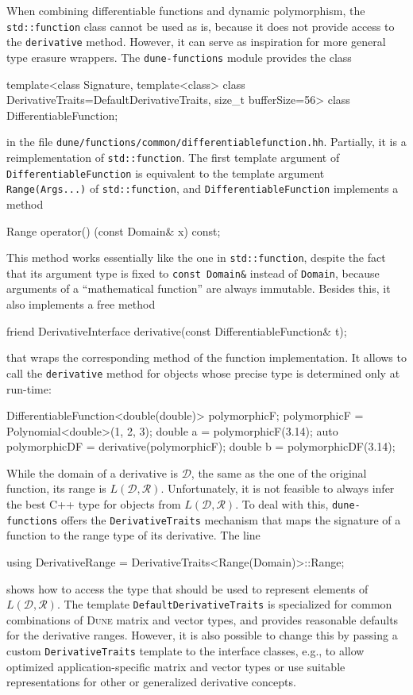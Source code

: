 \documentclass[11pt,
                 numbers=noenddot,
                 headings=normal,
                 DIV16, BCOR10mm]{scrartcl}
\newcommand{\cpp}{\lstinline}
\theoremstyle{remark}
\newcommand{\dune}{\textsc{Dune}\xspace}
\newcommand{\dunemodule}[1]{\texttt{#1}}
\newcommand{\file}[1]{\texttt{#1}}
\begin{document}
When combining differentiable functions and dynamic polymorphism, the \cpp{std::function} class cannot be used as is,
because it does not provide access to the \cpp{derivative} method.  However, it can serve as inspiration for more general
type erasure wrappers. The \dunemodule{dune-functions} module provides the class
\begin{c++}
template<class Signature,
         template<class> class DerivativeTraits=DefaultDerivativeTraits,
         size_t bufferSize=56>
class DifferentiableFunction;
\end{c++}
in the file \file{dune/functions/common/differentiablefunction.hh}. Partially, it is a reimplementation of
\cpp{std::function}. The first template argument of \cpp{DifferentiableFunction} is equivalent to the template
argument \cpp{Range(Args...)} of \cpp{std::function}, and \cpp{DifferentiableFunction} implements a method
\begin{c++}
Range operator() (const Domain& x) const;
\end{c++}
This method works essentially like the one in \cpp{std::function}, despite the fact that its argument type
is fixed to \cpp{const Domain&} instead of \cpp{Domain}, because arguments of a ``mathematical function''
are always immutable.
Besides this, it also implements a free method
\begin{c++}
friend DerivativeInterface derivative(const DifferentiableFunction& t);
\end{c++}
that wraps the corresponding method of the function implementation.
It allows to call the \cpp{derivative} method for objects whose precise type is determined only
at run-time:
\begin{c++}
DifferentiableFunction<double(double)> polymorphicF;
polymorphicF = Polynomial<double>({1, 2, 3});
double a = polymorphicF(3.14);
auto polymorphicDF = derivative(polymorphicF);
double b = polymorphicDF(3.14);
\end{c++}

While the domain of a derivative is $\mathcal{D}$, the same as the one of the
original function, its range is $L(\mathcal{D},\mathcal{R})$.
Unfortunately, it is not feasible to always infer the best C++ type for objects from $L(\mathcal{D},\mathcal{R})$.
To deal with this, \dunemodule{dune-functions} offers the
\cpp{DerivativeTraits} mechanism that maps the signature
of a function to the range type of its derivative.  The line
\begin{c++}
using DerivativeRange = DerivativeTraits<Range(Domain)>::Range;
\end{c++}
shows how to access the type that should be used
to represent elements of $L(\mathcal{D},\mathcal{R})$.
The template \cpp{DefaultDerivativeTraits} is specialized
for common combinations of \dune matrix and vector types, and provides
reasonable defaults for the derivative
ranges. However, it is also possible to change
this by passing a custom \cpp{DerivativeTraits} template to the
interface classes, e.g., to allow optimized application-specific
matrix and vector types or use suitable representations for
other or generalized derivative concepts.
\end{document}
